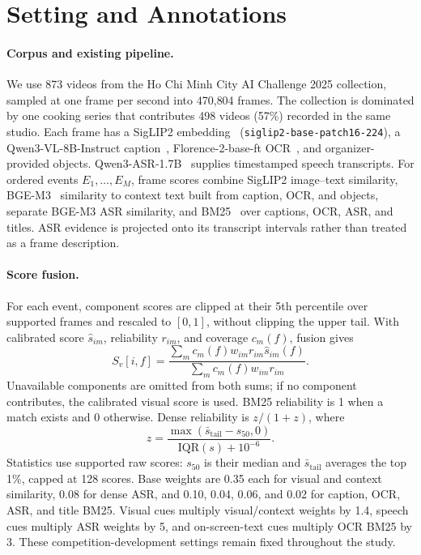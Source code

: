 \section{Setting and Annotations}
\label{sec:benchmark}

\paragraph{Corpus and existing pipeline.}
We use 873 videos from the Ho Chi Minh City AI Challenge 2025 collection, sampled at one frame per second into 470{,}804 frames.
The collection is dominated by one cooking series that contributes 498 videos (57\%) recorded in the same studio.
Each frame has a SigLIP2 embedding~\cite{tschannen2025siglip2} (\texttt{siglip2-base-patch16-224}), a Qwen3-VL-8B-Instruct caption~\cite{qwen2025qwen3vl}, Florence-2-base-ft OCR~\cite{xiao2024florence2}, and organizer-provided objects.
Qwen3-ASR-1.7B~\cite{shi2026qwen3asr} supplies timestamped speech transcripts.
For ordered events $E_1,\dots,E_M$, frame scores combine SigLIP2 image--text similarity, BGE-M3~\cite{chen2024bgem3} similarity to context text built from caption, OCR, and objects, separate BGE-M3 ASR similarity, and BM25~\cite{robertson2009bm25} over captions, OCR, ASR, and titles.
ASR evidence is projected onto its transcript intervals rather than treated as a frame description.

\paragraph{Score fusion.}
For each event, component scores are clipped at their 5th percentile over supported frames and rescaled to $[0,1]$, without clipping the upper tail.
With calibrated score $\hat s_{im}$, reliability $r_{im}$, and coverage $c_m(f)$, fusion gives
\begin{equation}
S_v[i,f]=\frac{\sum_m c_m(f)w_{im}r_{im}\hat s_{im}(f)}{\sum_m c_m(f)w_{im}r_{im}}.
\label{eq:fusion}
\end{equation}
Unavailable components are omitted from both sums; if no component contributes, the calibrated visual score is used.
BM25 reliability is 1 when a match exists and 0 otherwise.
Dense reliability is $z/(1+z)$, where
\[
z=\frac{\max(\bar{s}_{\mathrm{tail}}-s_{50},0)}{\mathrm{IQR}(s)+10^{-6}}.
\]
Statistics use supported raw scores: $s_{50}$ is their median and $\bar{s}_{\mathrm{tail}}$ averages the top 1\%, capped at 128 scores.
Base weights are 0.35 each for visual and context similarity, 0.08 for dense ASR, and 0.10, 0.04, 0.06, and 0.02 for caption, OCR, ASR, and title BM25.
Visual cues multiply visual/context weights by 1.4, speech cues multiply ASR weights by 5, and on-screen-text cues multiply OCR BM25 by 3.
These competition-development settings remain fixed throughout the study.

